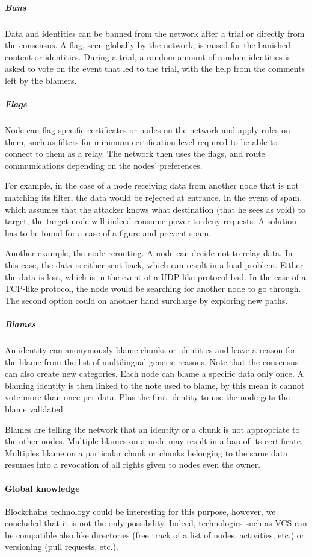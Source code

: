 \subparagraph{Bans} Data and identities can be banned from the network after a trial or directly from the consensus. A flag, seen globally by the network, is raised for the banished content or identities. During a trial, a random amount of random identities is asked to vote on the event that led to the trial, with the help from the comments left by the blamers.

\subparagraph{Flags} Node can flag specific certificates or nodes on the network and apply rules on them, such as filters for minimum certification level required to be able to connect to them as a relay. The network then uses the flags, and route communications depending on the nodes' preferences.

For example, in the case of a node receiving data from another node that is not matching its filter, the data would be rejected at entrance. In the event of spam, which assumes that the attacker knows what destination (that he sees as void) to target, the target node will indeed consume power to deny requests. A solution has to be found for a case of a figure and prevent spam.

Another example, the node rerouting. A node can decide not to relay data. In this case, the data is either sent back, which can result in a load problem. Either the data is lost, which is in the event of a UDP-like protocol bad. In the case of a TCP-like protocol, the node would be searching for another node to go through. The second option could on another hand surcharge by exploring new paths.

\subparagraph{Blames} An identity can anonymously blame chunks or identities and leave a reason for the blame from the list of multilingual generic reasons. Note that the consensus can also create new categories. Each node can blame a specific data only once. A blaming identity is then linked to the note used to blame, by this mean it cannot vote more than once per data. Plus the first identity to use the node gets the blame validated.

Blames are telling the network that an identity or a chunk is not appropriate to the other nodes. Multiple blames on a node may result in a ban of its certificate. Multiples blame on a particular chunk or chunks belonging to the same data resumes into a revocation of all rights given to nodes even the owner.

\paragraph{Global knowledge} Blockchains technology could be interesting for this purpose, however, we concluded that it is not the only possibility. Indeed, technologies such as VCS can be compatible also like directories (free track of a list of nodes, activities, etc.) or versioning (pull requests, etc.).

